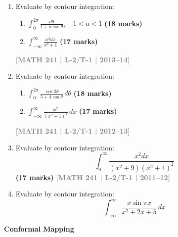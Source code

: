 \documentclass[12pt,a4paper]{article}
\newcommand{\yr}[1]{\hfill\textcolor{gray}{\small\textbf{[#1]}}}
\newcommand{\mk}[1]{\textcolor{orange!70!black}{\small\textbf{(#1 marks)}}}
\newcommand{\subtopic}[2]{%
  \vspace{10pt}
  \noindent\begin{tcolorbox}[colback=#1!8,colframe=#1,boxrule=0.6pt,arc=4pt,
    left=6pt,right=6pt,top=4pt,bottom=4pt]
    \small\bfseries\textcolor{#1}{#2}
  \end{tcolorbox}
  \vspace{2pt}
}
\begin{document}
\begin{enumerate}
\item Evaluate by contour integration:
\begin{enumerate}
  \item $\displaystyle\int_{0}^{2\pi} \frac{d\theta}{1+a\cos\theta}$, \quad $-1<a<1$ \mk{18}
  \item $\displaystyle\int_{-\infty}^{\infty} \frac{x^{2}dx}{x^{6}+1}$ \mk{17}
\end{enumerate}
\yr{MATH 241 | L-2/T-1 | 2013--14}

\item Evaluate by contour integration:
\begin{enumerate}
  \item $\displaystyle\int_{0}^{2\pi} \frac{\cos 2\theta}{5+4\cos\theta}\,d\theta$ \mk{18}
  \item $\displaystyle\int_{-\infty}^{\infty} \frac{x^{2}}{{(x^{2}+1)}^{2}}\,dx$ \mk{17}
\end{enumerate}
\yr{MATH 241 | L-2/T-1 | 2012--13}

\item Evaluate by contour integration:
\[
\int_{0}^{\infty} \frac{x^2 dx}{(x^2 + 9)(x^2 + 4)^2}
\]
\mk{17} \yr{MATH 241 | L-2/T-1 | 2011--12}

\item Evaluate by contour integration:
\[
\int_{-\infty}^{\infty} \frac{x\sin\pi x}{x^{2}+2x+5}\,dx 
\]

\end{enumerate}

\subtopic{cE}{Conformal Mapping}
\label{sub:s5-conformal}
\end{document}
